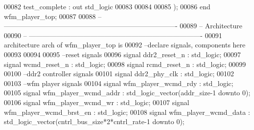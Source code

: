 \begin{DoxyCode}
00082         \textcolor{vhdlchar}{test_complete}           \textcolor{vhdlchar}{:} \textcolor{keywordflow}{out} \textcolor{comment}{std\_logic}
00083         
00084         
00085         \textcolor{vhdlchar}{)};
00086 \textcolor{keywordflow}{end} \textcolor{vhdlchar}{wfm\_player\_top};
00087 
00088 \textcolor{keyword}{-- ----------------------------------------------------------------------------}
00089 \textcolor{keyword}{-- Architecture}
00090 \textcolor{keyword}{-- ----------------------------------------------------------------------------}
00091 \textcolor{keywordflow}{architecture} arch \textcolor{keywordflow}{of} wfm_player_top is
00092 \textcolor{keyword}{--declare signals,  components here}
00093 
00094 
00095 \textcolor{keyword}{--reset signals}
00096 \textcolor{keywordflow}{signal} \textcolor{vhdlchar}{ddr2_reset_n}                     \textcolor{vhdlchar}{:} \textcolor{comment}{std\_logic};
00097 \textcolor{keywordflow}{signal} \textcolor{vhdlchar}{wcmd_reset_n}                 \textcolor{vhdlchar}{:} \textcolor{comment}{std\_logic};
00098 \textcolor{keywordflow}{signal} \textcolor{vhdlchar}{rcmd_reset_n}                 \textcolor{vhdlchar}{:} \textcolor{comment}{std\_logic};
00099 
00100 \textcolor{keyword}{--ddr2 controller signals}
00101 \textcolor{keywordflow}{signal} \textcolor{vhdlchar}{ddr2_phy_clk} \textcolor{vhdlchar}{:} \textcolor{comment}{std\_logic};
00102 
00103 \textcolor{keyword}{--wfm player signals}
00104 \textcolor{keywordflow}{signal} \textcolor{vhdlchar}{wfm_player_wcmd_rdy}          \textcolor{vhdlchar}{:} \textcolor{comment}{std\_logic};
00105 \textcolor{keywordflow}{signal} \textcolor{vhdlchar}{wfm_player_wcmd_addr}     \textcolor{vhdlchar}{:} \textcolor{comment}{std\_logic\_vector}\textcolor{vhdlchar}{(}\textcolor{vhdlchar}{addr_size}\textcolor{vhdlchar}{-}\textcolor{vhdllogic}{}\textcolor{vhdllogic}{1} \textcolor{keywordflow}{downto} \textcolor{vhdllogic}{}\textcolor{vhdllogic}{0}\textcolor{vhdlchar}{)};
00106 \textcolor{keywordflow}{signal} \textcolor{vhdlchar}{wfm_player_wcmd_wr}           \textcolor{vhdlchar}{:} \textcolor{comment}{std\_logic};
00107 \textcolor{keywordflow}{signal} \textcolor{vhdlchar}{wfm_player_wcmd_brst_en}  \textcolor{vhdlchar}{:} \textcolor{comment}{std\_logic};    
00108 \textcolor{keywordflow}{signal} \textcolor{vhdlchar}{wfm_player_wcmd_data}     \textcolor{vhdlchar}{:} \textcolor{comment}{std\_logic\_vector}\textcolor{vhdlchar}{(}\textcolor{vhdlchar}{cntrl_bus_size}\textcolor{vhdlchar}{*}\textcolor{vhdllogic}{}\textcolor{vhdllogic}{2}\textcolor{vhdlchar}{*}\textcolor{vhdlchar}{cntrl_rate}\textcolor{vhdlchar}{-}\textcolor{vhdllogic}{}\textcolor{vhdllogic}{1} \textcolor{keywordflow}{downto} \textcolor{vhdllogic}{}\textcolor{vhdllogic}{0}\textcolor{vhdlchar}{)};

\end{DoxyCode}
